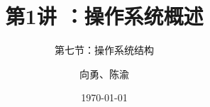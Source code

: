 


\title[第1讲]{第1讲 ：操作系统概述} %
\subtitle{第七节：操作系统结构}
\author{向勇、陈渝} %
\date{\today} %



\begin{frame}
\titlepage %
\end{frame}

%
%


